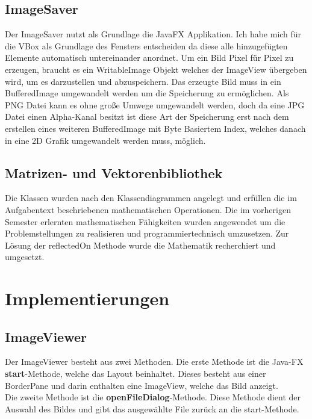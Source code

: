 \documentclass[14pt]{extarticle}
\begin{document}
\subsection{ImageSaver}
Der ImageSaver nutzt als Grundlage die JavaFX Applikation. Ich habe mich für die VBox als Grundlage des Fensters entscheiden da diese alle hinzugefügten Elemente automatisch untereinander anordnet. Um ein Bild Pixel für Pixel zu erzeugen, braucht es ein WritableImage Objekt welches der ImageView übergeben wird, um es darzustellen und abzuspeichern. 
\newline
Das erzeugte Bild muss in ein BufferedImage umgewandelt werden um die Speicherung zu ermöglichen. Als PNG Datei kann es ohne große Umwege umgewandelt werden, doch da eine JPG Datei einen Alpha-Kanal besitzt ist diese Art der Speicherung erst nach dem erstellen eines weiteren BufferedImage mit Byte Basiertem Index, welches danach in eine 2D Grafik umgewandelt werden muss, möglich.  

\subsection{Matrizen- und Vektorenbibliothek}
Die Klassen wurden nach den Klassendiagrammen angelegt und erfüllen die im Aufgabentext beschriebenen mathematischen Operationen. Die im vorherigen Semester erlernten mathematischen Fähigkeiten  wurden angewendet um die Problemstellungen zu realisieren und programmiertechnisch umzusetzen. Zur Lösung der reflectedOn Methode wurde die Mathematik recherchiert und umgesetzt.

\section{Implementierungen}
\subsection{ImageViewer}
Der ImageViewer besteht aus zwei Methoden. Die erste Methode ist die Java-FX \textbf{start}-Methode, welche das Layout beinhaltet. Dieses besteht aus einer BorderPane und darin enthalten eine ImageView, welche das Bild anzeigt. \\
Die zweite Methode ist die \textbf{openFileDialog}-Methode. Diese Methode dient der Auswahl des Bildes und gibt das ausgewählte File zurück an die start-Methode.
\end{document}
